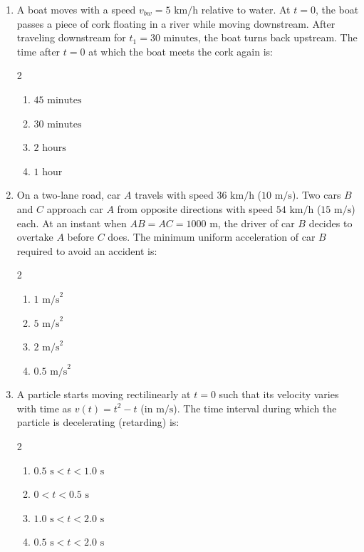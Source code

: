 \documentclass[11pt,a4paper]{article}
\begin{document}
\begin{enumerate}[label=\textbf{\textcolor{l3Crimson}{Q\arabic*.}},leftmargin=24pt,itemsep=10pt,start=51]
  \item A boat moves with a speed $v_{bw} = 5\text{ km/h}$ relative to water. At $t = 0$, the boat passes a piece of cork floating in a river while moving downstream. After traveling downstream for $t_1 = 30\text{ minutes}$, the boat turns back upstream. The time after $t = 0$ at which the boat meets the cork again is:
  \begin{multicols}{2}
  \begin{enumerate}[label=\textbf{\textcolor{primaryDark}{(\Alph*)}},itemsep=2pt]
    \item $45\text{ minutes}$
    \item $30\text{ minutes}$
    \item $2\text{ hours}$
    \item $1\text{ hour}$
  \end{enumerate}
  \end{multicols}

  \item On a two-lane road, car $A$ travels with speed $36\text{ km/h}$ ($10\text{ m/s}$). Two cars $B$ and $C$ approach car $A$ from opposite directions with speed $54\text{ km/h}$ ($15\text{ m/s}$) each. At an instant when $AB = AC = 1000\text{ m}$, the driver of car $B$ decides to overtake $A$ before $C$ does. The minimum uniform acceleration of car $B$ required to avoid an accident is:
  \begin{multicols}{2}
  \begin{enumerate}[label=\textbf{\textcolor{primaryDark}{(\Alph*)}},itemsep=2pt]
    \item $1\text{ m/s}^2$
    \item $5\text{ m/s}^2$
    \item $2\text{ m/s}^2$
    \item $0.5\text{ m/s}^2$
  \end{enumerate}
  \end{multicols}

  \item A particle starts moving rectilinearly at $t = 0$ such that its velocity varies with time as $v(t) = t^2 - t$ (in $\text{m/s}$). The time interval during which the particle is decelerating (retarding) is:
  \begin{multicols}{2}
  \begin{enumerate}[label=\textbf{\textcolor{primaryDark}{(\Alph*)}},itemsep=2pt]
    \item $0.5\text{ s} < t < 1.0\text{ s}$
    \item $0 < t < 0.5\text{ s}$
    \item $1.0\text{ s} < t < 2.0\text{ s}$
    \item $0.5\text{ s} < t < 2.0\text{ s}$
  \end{enumerate}
  \end{multicols}


\end{enumerate}
\end{document}
